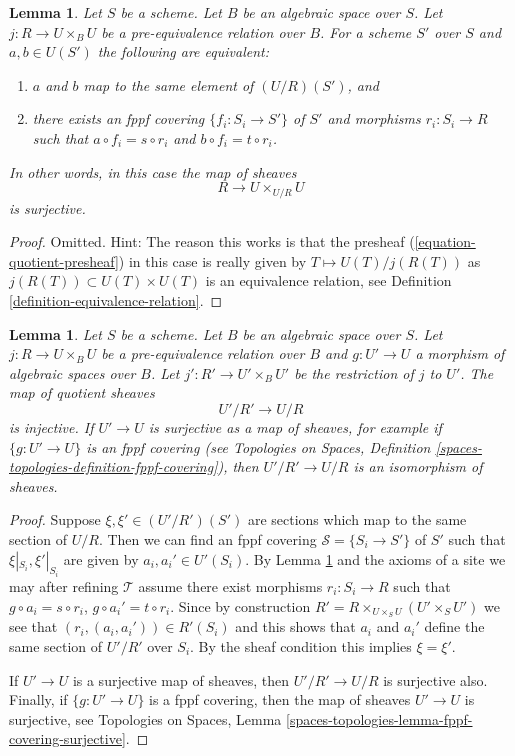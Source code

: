\documentclass{stacks-project}
\theoremstyle{plain}
\newtheorem{lemma}[subsection]{Lemma}
\theoremstyle{definition}
\theoremstyle{remark}
\numberwithin{equation}{subsection}
\begin{document}
\begin{lemma}
\label{lemma-quotient-pre-equivalence}
Let $S$ be a scheme. Let $B$ be an algebraic space over $S$.
Let $j : R \to U \times_B U$ be a pre-equivalence relation over $B$.
For a scheme $S'$ over $S$ and $a, b \in U(S')$ the following are equivalent:
\begin{enumerate}
\item $a$ and $b$ map to the same element of $(U/R)(S')$, and
\item there exists an fppf covering $\{f_i : S_i \to S'\}$ of $S'$
and morphisms $r_i : S_i \to R$ such that
$a \circ f_i = s \circ r_i$ and $b \circ f_i = t \circ r_i$.
\end{enumerate}
In other words, in this case the map of sheaves
$$
R \longrightarrow U \times_{U/R} U
$$
is surjective.
\end{lemma}

\begin{proof}
Omitted. Hint: The reason this works is that the presheaf
(\ref{equation-quotient-presheaf}) in this case is really given
by $T \mapsto U(T)/j(R(T))$ as $j(R(T)) \subset U(T) \times U(T)$
is an equivalence relation, see
Definition \ref{definition-equivalence-relation}.
\end{proof}

\begin{lemma}
\label{lemma-quotient-pre-equivalence-relation-restrict}
Let $S$ be a scheme. Let $B$ be an algebraic space over $S$.
Let $j : R \to U \times_B U$ be a pre-equivalence relation over $B$
and $g : U' \to U$ a morphism of algebraic spaces over $B$.
Let $j' : R' \to U' \times_B U'$ be the restriction of $j$ to $U'$.
The map of quotient sheaves
$$
U'/R' \longrightarrow U/R
$$
is injective. If $U' \to U$ is surjective as a map of sheaves, for
example if $\{g : U' \to U\}$ is an fppf covering (see
Topologies on Spaces,
Definition \ref{spaces-topologies-definition-fppf-covering}),
then $U'/R' \to U/R$ is an isomorphism of sheaves.
\end{lemma}

\begin{proof}
Suppose $\xi, \xi' \in (U'/R')(S')$ are sections which
map to the same section of $U/R$.
Then we can find an fppf covering $\mathcal{S} = \{S_i \to S'\}$ of $S'$
such that $\xi|_{S_i}, \xi'|_{S_i}$ are given by $a_i, a_i' \in U'(S_i)$. By
Lemma \ref{lemma-quotient-pre-equivalence}
and the axioms of a site we may after refining
$\mathcal{T}$ assume there exist morphisms $r_i : S_i \to R$
such that $g \circ a_i = s \circ r_i$, $g \circ a_i' = t \circ r_i$.
Since by construction
$R' = R \times_{U \times_S U} (U' \times_S U')$
we see that $(r_i, (a_i, a_i')) \in R'(S_i)$ and this
shows that $a_i$ and $a_i'$ define the same section
of $U'/R'$ over $S_i$. By the sheaf condition this implies
$\xi = \xi'$.

\medskip\noindent
If $U' \to U$ is a surjective map of sheaves, then $U'/R' \to U/R$ is
surjective also. Finally, if $\{g : U' \to U\}$ is a fppf covering, then
the map of sheaves $U' \to U$ is surjective, see
Topologies on Spaces,
Lemma \ref{spaces-topologies-lemma-fppf-covering-surjective}.
\end{proof}
\end{document}
